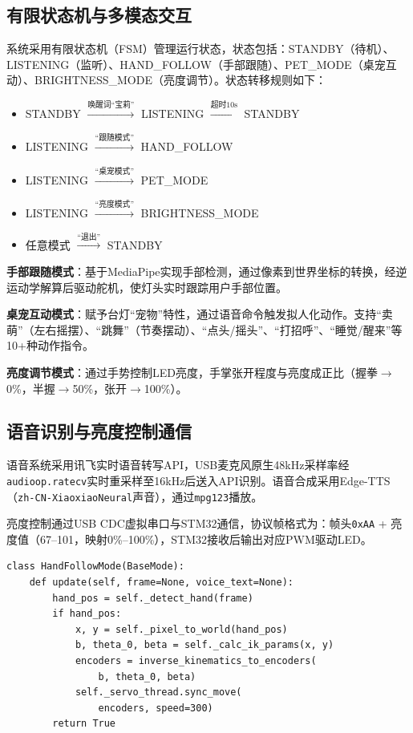 \documentclass[12pt,a4paper]{ctexart}
\begin{document}
\subsection{有限状态机与多模态交互}

系统采用有限状态机（FSM）管理运行状态，状态包括：STANDBY（待机）、LISTENING（监听）、HAND\_FOLLOW（手部跟随）、PET\_MODE（桌宠互动）、BRIGHTNESS\_MODE（亮度调节）。状态转移规则如下：

\begin{itemize}
    \item STANDBY $\xrightarrow{\text{唤醒词``宝莉''}}$ LISTENING $\xrightarrow{\text{超时10s}}$ STANDBY
    \item LISTENING $\xrightarrow{\text{``跟随模式''}}$ HAND\_FOLLOW
    \item LISTENING $\xrightarrow{\text{``桌宠模式''}}$ PET\_MODE
    \item LISTENING $\xrightarrow{\text{``亮度模式''}}$ BRIGHTNESS\_MODE
    \item 任意模式 $\xrightarrow{\text{``退出''}}$ STANDBY
\end{itemize}

\textbf{手部跟随模式}：基于MediaPipe实现手部检测，通过像素到世界坐标的转换，经逆运动学解算后驱动舵机，使灯头实时跟踪用户手部位置。

\textbf{桌宠互动模式}：赋予台灯``宠物''特性，通过语音命令触发拟人化动作。支持``卖萌''（左右摇摆）、``跳舞''（节奏摆动）、``点头/摇头''、``打招呼''、``睡觉/醒来''等10+种动作指令。

\textbf{亮度调节模式}：通过手势控制LED亮度，手掌张开程度与亮度成正比（握拳$\to$0\%，半握$\to$50\%，张开$\to$100\%）。

\subsection{语音识别与亮度控制通信}

语音系统采用讯飞实时语音转写API，USB麦克风原生48kHz采样率经\texttt{audioop.ratecv}实时重采样至16kHz后送入API识别。语音合成采用Edge-TTS（\texttt{zh-CN-XiaoxiaoNeural}声音），通过\texttt{mpg123}播放。

亮度控制通过USB CDC虚拟串口与STM32通信，协议帧格式为：帧头\texttt{0xAA} + 亮度值（67--101，映射0\%--100\%），STM32接收后输出对应PWM驱动LED。

\begin{lstlisting}[style=pythonstyle, caption={手部跟随模式核心逻辑}]
class HandFollowMode(BaseMode):
    def update(self, frame=None, voice_text=None):
        hand_pos = self._detect_hand(frame)
        if hand_pos:
            x, y = self._pixel_to_world(hand_pos)
            b, theta_0, beta = self._calc_ik_params(x, y)
            encoders = inverse_kinematics_to_encoders(
                b, theta_0, beta)
            self._servo_thread.sync_move(
                encoders, speed=300)
        return True
\end{lstlisting}
\end{document}
